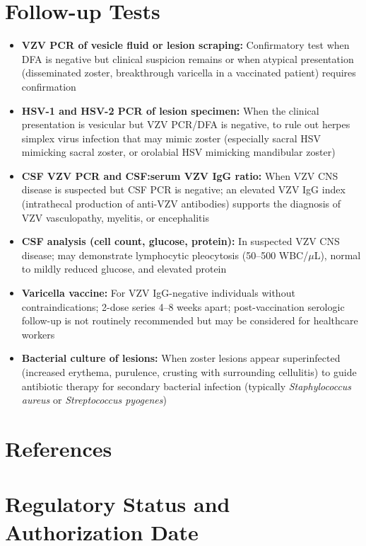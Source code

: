 \section*{Follow-up Tests}
\begin{itemize}
  \item \textbf{VZV PCR of vesicle fluid or lesion scraping:} Confirmatory test when DFA is negative but clinical suspicion remains or when atypical presentation (disseminated zoster, breakthrough varicella in a vaccinated patient) requires confirmation
  \item \textbf{HSV-1 and HSV-2 PCR of lesion specimen:} When the clinical presentation is vesicular but VZV PCR/DFA is negative, to rule out herpes simplex virus infection that may mimic zoster (especially sacral HSV mimicking sacral zoster, or orolabial HSV mimicking mandibular zoster)
  \item \textbf{CSF VZV PCR and CSF:serum VZV IgG ratio:} When VZV CNS disease is suspected but CSF PCR is negative; an elevated VZV IgG index (intrathecal production of anti-VZV antibodies) supports the diagnosis of VZV vasculopathy, myelitis, or encephalitis
  \item \textbf{CSF analysis (cell count, glucose, protein):} In suspected VZV CNS disease; may demonstrate lymphocytic pleocytosis (50--500 WBC/$\mu$L), normal to mildly reduced glucose, and elevated protein
  \item \textbf{Varicella vaccine:} For VZV IgG-negative individuals without contraindications; 2-dose series 4--8 weeks apart; post-vaccination serologic follow-up is not routinely recommended but may be considered for healthcare workers
  \item \textbf{Bacterial culture of lesions:} When zoster lesions appear superinfected (increased erythema, purulence, crusting with surrounding cellulitis) to guide antibiotic therapy for secondary bacterial infection (typically \textit{Staphylococcus aureus} or \textit{Streptococcus pyogenes})
\end{itemize}

\section*{References}



\clearpage
\section*{Regulatory Status and Authorization Date}

\clearpage
